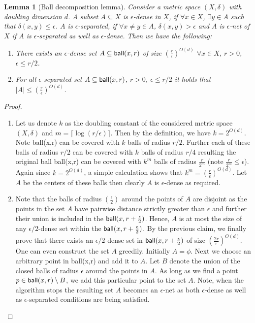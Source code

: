 \documentclass[11pt]{article}
\newtheorem{lemma}{Lemma}[section]
\newcommand{\ball}{{\sf ball}}
\begin{document}
\begin{lemma}[Ball decomposition lemma]\label{apd:balldecomp}
Consider a metric space $(X,\delta)$
with doubling dimension $d$. A subset 
$A\subseteq X$ is {\it $\epsilon$-dense} in $X$, if $\forall x\in X$, $\exists y\in A$ such that $\delta(x,y)\leq \epsilon$.
$A$ is {\it $\epsilon$-separated}, if
$\forall x \neq y\in A$, $\delta(x,y)> \epsilon$
and  $A$ is $\epsilon$-net of $X$ if $A$ is $\epsilon$-separated as well as $\epsilon$-dense.
 Then we have the following: 
 \begin{enumerate}
\item There exists an $\epsilon$-dense set $A\subseteq \ball{(x,r)}$ of size $(\frac{r}{\epsilon})^{O(d)}$  $\forall x\in X$, $r>0$, $\epsilon \leq r/2$. 
\item For all $\epsilon$-separated set $A\subseteq \ball{(x,r)}$, $r>0$, $\epsilon \leq r/2$ it holds that $|A|\leq (\frac{r}{\epsilon})^{O(d)}$.
\end{enumerate}
\end{lemma}
\begin{proof}
\begin{enumerate}
\item Let us denote $k$ as the doubling constant of the considered metric space $(X,\delta)$ and $m=\lceil \log (r/\epsilon) \rceil$. Then by the definition, we have $k=2^{O(d)}$. Note \ball{(x,r)} can be covered with $k$ balls of radius $r/2$. Further each of these balls of radius $r/2$ can be covered with $k$ balls of radius $r/4$ resulting the original ball \ball{(x,r)} can be covered with $k^m$ balls of radius $\frac{r}{2^m}$ (note $\frac{r}{2^m}\leq \epsilon$). Again since $k=2^{O(d)}$, a simple calculation shows that $k^m=(\frac{r}{\epsilon})^{O(d)}$. Let $A$  be the centers of these balls then clearly $A$ is $\epsilon$-dense as required. 
\item  Note that the balls of radius $(\frac{\epsilon}{2})$ around the points of $A$ are disjoint as the points in the set $A$ have pairwise distance strictly greater than $\epsilon$
  and further their union is included in the $\ball{(x,r+\frac{\epsilon}{2})}$. Hence, $A$ is at most the size of any $\epsilon/2$-dense set within the $\ball{(x,r+\frac{\epsilon}{2})}$. By the previous claim, we finally prove that there exists an $\epsilon/2$-dense set in  $\ball{(x,r+\frac{\epsilon}{2})}$ of size $(\frac{2r}{\epsilon})^{O(d)}$.\\
One can even construct the set $A$ greedily. Initially $A=\phi$. Next we choose an arbitrary point in \ball{(x,r)} and add it to $A$. Let $B$ denote the union of the closed balls of radius $\epsilon$ around the points in $A$. As long as we find a point $p\in \ball{(x,r)}\setminus B$, we add this particular point to the set $A$. Note, when the algorithm stops the resulting set $A$ becomes an $\epsilon$-net as both $\epsilon$-dense as well as $\epsilon$-separated conditions are being satisfied. 
\end{enumerate}
\end{proof}
\end{document}
